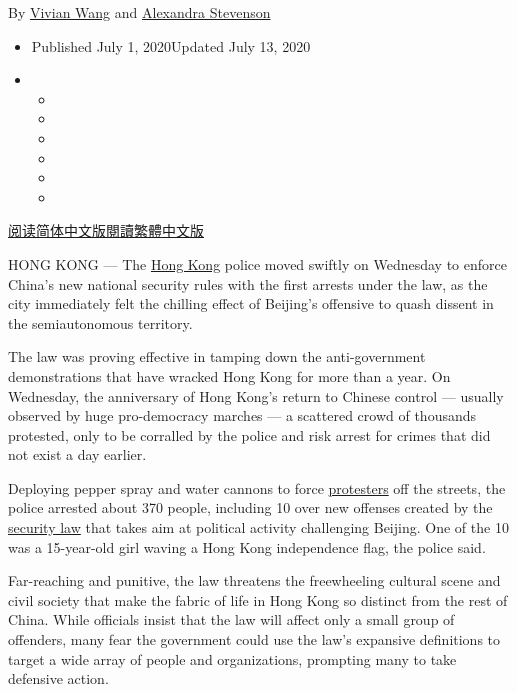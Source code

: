 By \href{https://www.nytimes.com/by/vivian-wang}{Vivian Wang} and
\href{https://www.nytimes.com/by/alexandra-stevenson}{Alexandra
Stevenson}

\begin{itemize}
\item
  Published July 1, 2020Updated July 13, 2020
\item
  \begin{itemize}
  \item
  \item
  \item
  \item
  \item
  \item
  \end{itemize}
\end{itemize}

\href{https://cn.nytimes.com/china/20200702/hong-kong-security-law-china/}{阅读简体中文版}\href{https://cn.nytimes.com/china/20200702/hong-kong-security-law-china/zh-han}{閱讀繁體中文版}

HONG KONG --- The
\href{https://www.nytimes.com/2020/07/20/world/asia/hong-kong-coronavirus.html}{Hong
Kong} police moved swiftly on Wednesday to enforce China's new national
security rules with the first arrests under the law, as the city
immediately felt the chilling effect of Beijing's offensive to quash
dissent in the semiautonomous territory.

The law was proving effective in tamping down the anti-government
demonstrations that have wracked Hong Kong for more than a year. On
Wednesday, the anniversary of Hong Kong's return to Chinese control ---
usually observed by huge pro-democracy marches --- a scattered crowd of
thousands protested, only to be corralled by the police and risk arrest
for crimes that did not exist a day earlier.

Deploying pepper spray and water cannons to force
\href{https://www.nytimes.com/2020/07/13/world/asia/hong-kong-elections-security.html}{protesters}
off the streets, the police arrested about 370 people, including 10 over
new offenses created by the
\href{https://www.nytimes.com/2020/07/13/world/asia/hong-kong-elections-security.html}{security
law} that takes aim at political activity challenging Beijing. One of
the 10 was a 15-year-old girl waving a Hong Kong independence flag, the
police said.

Far-reaching and punitive, the law threatens the freewheeling cultural
scene and civil society that make the fabric of life in Hong Kong so
distinct from the rest of China. While officials insist that the law
will affect only a small group of offenders, many fear the government
could use the law's expansive definitions to target a wide array of
people and organizations, prompting many to take defensive action.

